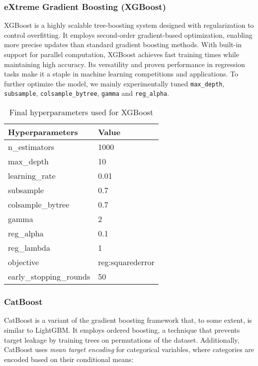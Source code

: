 \documentclass{article}
\begin{document}
\subsubsection{eXtreme Gradient Boosting (XGBoost)}

XGBoost is a highly scalable tree-boosting system designed with regularization to control overfitting. It employs second-order gradient-based optimization, enabling more precise updates than standard gradient boosting methods. With built-in support for parallel computation, XGBoost achieves fast training times while maintaining high accuracy. Its versatility and proven performance in regression tasks make it a staple in machine learning competitions and applications. To further optimize the model, we mainly experimentally tuned \texttt{max\_depth}, \texttt{subsample}, \texttt{colsample\_bytree}, \texttt{gamma} and \texttt{reg\_alpha}.

\begin{table}[h]
   \centering
   \caption{Final hyperparameters used for XGBoost}
   \begin{tabular}{ll}
       \hline
       \textbf{Hyperparameters} & \textbf{Value} \\
       \hline
       n\_estimators & 1000 \\
       max\_depth & 10 \\
       learning\_rate & 0.01 \\
       subsample & 0.7 \\
       colsample\_bytree & 0.7 \\
       gamma & 2 \\
       reg\_alpha & 0.1 \\
       reg\_lambda & 1 \\
       objective & reg:squarederror \\
       early\_stopping\_rounds & 50 \\
       \hline
   \end{tabular}
\end{table}

\subsubsection{CatBoost}

CatBoost is a variant of the gradient boosting framework that, to some extent, is similar to LightGBM. It employs ordered boosting, a technique that prevents target leakage by training trees on permutations of the dataset. Additionally, CatBoost uses \textit{mean target encoding} for categorical variables, where categories are encoded based on their conditional means:
\end{document}
